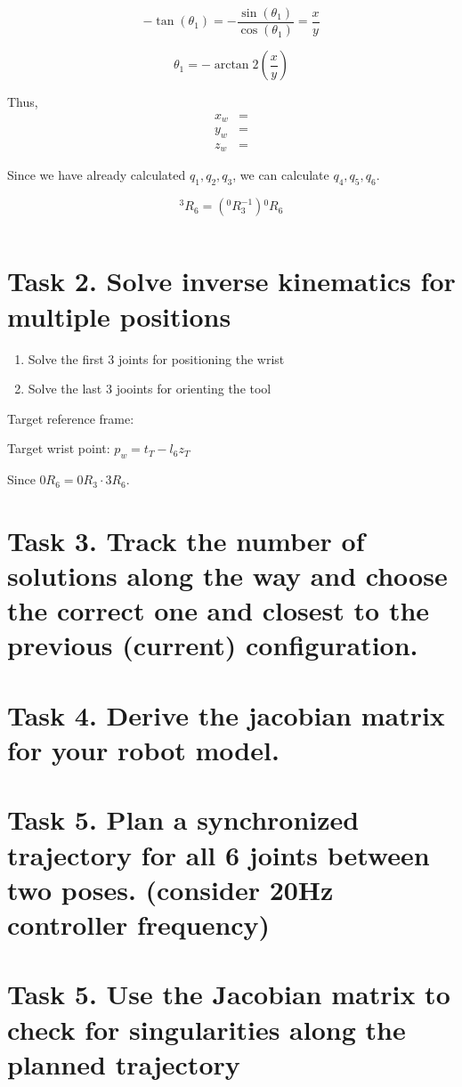 \documentclass{article}
\begin{document}
\[-\tan(\theta_1) = -\frac{\sin(\theta_1)}{\cos(\theta_1)} = \dfrac{x}{y}\]

\[\theta_1 = -\arctan2(\dfrac{x}{y})\]


Thus, 
\begin{align*}
    x_w &= \\
    y_w &= \\
    z_w &= 
\end{align*}

Since we have already calculated $q_1, q_2, q_3$, we can calculate $q_4, q_5, q_6$. 

\[{}^3R_6 = ({}^0R_3^{-1}) {}^0R_6\]



\[\]



\section{Task 2. Solve inverse kinematics for multiple positions}

\begin{enumerate}
    \item Solve the first 3 joints for positioning the wrist
    \item Solve the last 3 jooints for orienting the tool
\end{enumerate}

Target reference frame: 



Target wrist point: $p_w = t_{T} - l_6 z_T$

Since $0R_6 = 0R_3 \cdot 3R_6$. 
\section{Task 3. Track the number of solutions along the way and choose the correct one and closest to
the previous (current) configuration.}
\section{Task 4. Derive the jacobian matrix for your robot model.}


\section{Task 5. Plan a synchronized trajectory for all 6 joints between two poses. (consider 20Hz
controller frequency)}
\section{Task 5. Use the Jacobian matrix to check for singularities along the planned trajectory}
\end{document}
